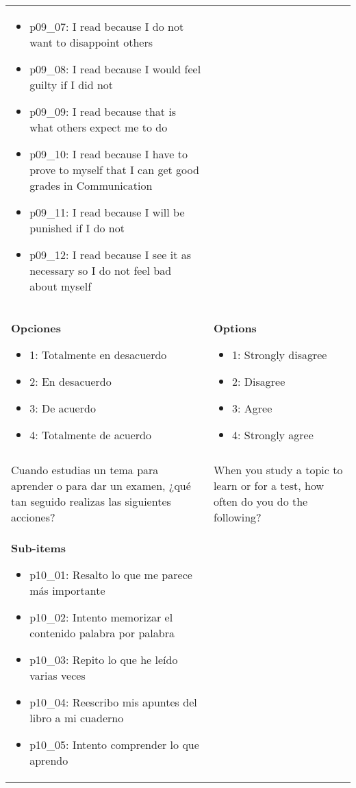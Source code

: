 \documentclass[11pt]{article}
\begin{document}
\begin{longtable}{@{}LL@{}}
\begin{itemize}[leftmargin=*]
\item p09\_07: I read because I do not want to disappoint others
\item p09\_08: I read because I would feel guilty if I did not
\item p09\_09: I read because that is what others expect me to do
\item p09\_10: I read because I have to prove to myself that I can get good grades in Communication
\item p09\_11: I read because I will be punished if I do not
\item p09\_12: I read because I see it as necessary so I do not feel bad about myself\end{itemize} \\
\textbf{Opciones}\par\begin{itemize}[leftmargin=*]\item 1: Totalmente en desacuerdo
\item 2: En desacuerdo
\item 3: De acuerdo
\item 4: Totalmente de acuerdo\end{itemize} & \textbf{Options}\par\begin{itemize}[leftmargin=*]\item 1: Strongly disagree
\item 2: Disagree
\item 3: Agree
\item 4: Strongly agree\end{itemize} \\
\addlinespace[4pt]
 \\ 
Cuando estudias un tema para aprender o para dar un examen, ¿qué tan seguido realizas las siguientes acciones? & When you study a topic to learn or for a test, how often do you do the following? \\
\textbf{Sub-items}\par\begin{itemize}[leftmargin=*]\item p10\_01: Resalto lo que me parece más importante
\item p10\_02: Intento memorizar el contenido palabra por palabra
\item p10\_03: Repito lo que he leído varias veces
\item p10\_04: Reescribo mis apuntes del libro a mi cuaderno
\item p10\_05: Intento comprender lo que aprendo

\end{itemize}
\end{longtable}
\end{document}
